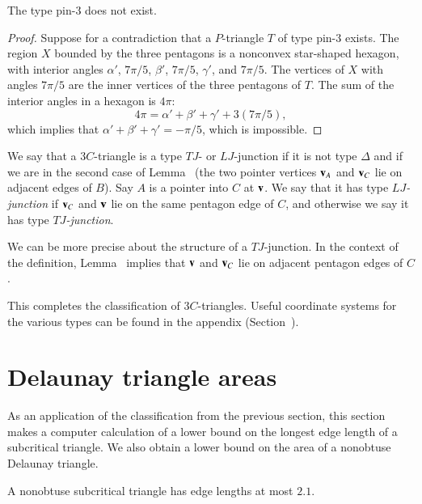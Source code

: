 \begin{lemma}  The type pin-$3$ does not exist.  
\end{lemma}

\begin{proof} 
  Suppose for a contradiction that a $P$-triangle $T$ of type pin-$3$
  exists.  The region $X$ bounded by the three pentagons is a
  nonconvex star-shaped hexagon, with interior angles $\alpha'$,
  $7\pi/5$, $\beta'$, $7\pi/5$, $\gamma'$, and $7\pi/5$.  The vertices
  of $X$ with angles $7\pi/5$ are the inner vertices of the three
  pentagons of $T$.  The sum of the interior angles in a hexagon is
  $4\pi$:
\[
4\pi = \alpha'+\beta'+\gamma' + 3 (7\pi/5),
\]
which implies that $\alpha'+\beta'+\gamma' = -\pi/5$, which is
impossible.
\end{proof}

\begin{definition}
  We say that a $3C$-triangle is a type $TJ$- or $LJ$-junction if it is
  not type $\Delta$ and if we are in the second case of
  Lemma~ (the two pointer vertices ${\mathbf v}_A$ and ${\mathbf v}_C$
  lie on adjacent edges of $B$).  Say $A$ is a pointer into $C$ at
  ${\mathbf v}$.  We say that it has type {\it $LJ$-junction} if ${\mathbf v}_C$ and ${\mathbf v}$
  lie on the same pentagon edge of $C$, and otherwise we say it has
  type {\it $TJ$-junction}.
\end{definition}

We can be more precise about the structure of a $TJ$-junction.  In the
context of the definition, Lemma~ implies that ${\mathbf v}$
and ${\mathbf v}_C$ lie on adjacent pentagon edges of $C$.

This completes the classification of $3C$-triangles.  Useful
coordinate systems for the various types can be found in the appendix
(Section~).

\section{Delaunay triangle areas}

As an application of the classification from the previous section,
this section makes a computer calculation of a lower bound on the
longest edge length of a subcritical triangle.  We also obtain a lower
bound on the area of a nonobtuse Delaunay triangle.

\begin{lemma} 
  A nonobtuse subcritical triangle has edge lengths at most $2.1$.
\end{lemma}

